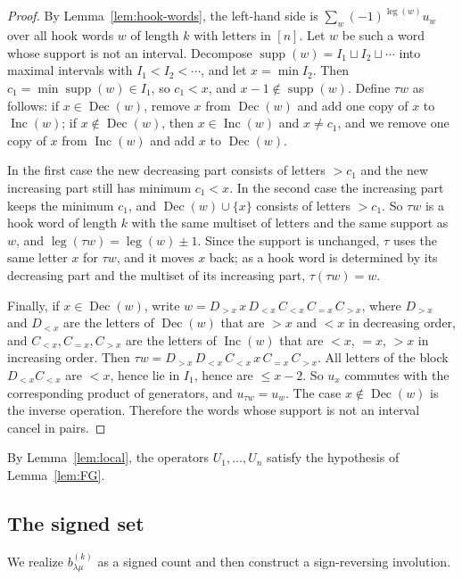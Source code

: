 \documentclass[11pt]{amsart}
\numberwithin{equation}{section}
\theoremstyle{definition}
\theoremstyle{remark}
\newcommand{\leg}{\operatorname{leg}}
\newcommand{\supp}{\operatorname{supp}}
\newcommand{\Inc}{\operatorname{Inc}}
\newcommand{\Dec}{\operatorname{Dec}}
\begin{document}
\begin{proof}
By Lemma~\ref{lem:hook-words}, the left-hand side is
$\sum_w(-1)^{\leg(w)}u_w$ over all hook words $w$ of length $k$ with letters
in $[n]$. Let $w$ be such a word whose support is not an interval.
Decompose $\supp(w)=I_1\sqcup I_2\sqcup\cdots$ into maximal intervals with
$I_1<I_2<\cdots$, and let $x=\min I_2$. Then $c_1=\min\supp(w)\in I_1$, so
$c_1<x$, and $x-1\notin\supp(w)$. Define $\tau w$ as follows: if
$x\in\Dec(w)$, remove $x$ from $\Dec(w)$ and add one copy of $x$ to
$\Inc(w)$; if $x\notin\Dec(w)$, then $x\in\Inc(w)$ and $x\neq c_1$, and we
remove one copy of $x$ from $\Inc(w)$ and add $x$ to $\Dec(w)$.

In the first case the new decreasing part consists of letters $>c_1$ and the
new increasing part still has minimum $c_1<x$. In the second case the
increasing part keeps the minimum $c_1$, and $\Dec(w)\cup\{x\}$ consists of
letters $>c_1$. So $\tau w$ is a hook word of length $k$ with the same
multiset of letters and the same support as $w$, and
$\leg(\tau w)=\leg(w)\pm1$. Since the support is unchanged, $\tau$ uses the
same letter $x$ for $\tau w$, and it moves $x$ back; as a hook word is
determined by its decreasing part and the multiset of its increasing part,
$\tau(\tau w)=w$.

Finally, if $x\in\Dec(w)$, write
$w=D_{>x}\,x\,D_{<x}\,C_{<x}\,C_{=x}\,C_{>x}$, where $D_{>x}$ and $D_{<x}$ are
the letters of $\Dec(w)$ that are $>x$ and $<x$ in decreasing order, and
$C_{<x},C_{=x},C_{>x}$ are the letters of $\Inc(w)$ that are $<x$, $=x$, $>x$
in increasing order. Then
$\tau w=D_{>x}\,D_{<x}\,C_{<x}\,x\,C_{=x}\,C_{>x}$. All letters of the block
$D_{<x}C_{<x}$ are $<x$, hence lie in $I_1$, hence are $\leq x-2$. So $u_x$
commutes with the corresponding product of generators, and
$u_{\tau w}=u_w$. The case $x\notin\Dec(w)$ is the inverse operation.
Therefore the words whose support is not an interval cancel in pairs.
\end{proof}

By Lemma~\ref{lem:local}, the operators $U_1,\dots,U_n$ satisfy the
hypothesis of Lemma~\ref{lem:FG}.

\subsection{The signed set}

We realize $b^{(k)}_{\lambda\mu}$ as a signed count and then construct a
sign-reversing involution.
\end{document}

